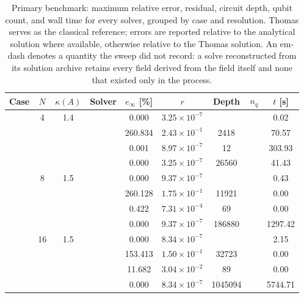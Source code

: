 \begin{table}[htbp]
  \centering
  \caption{Primary benchmark: maximum relative error, residual, circuit depth, qubit count, and wall time for every solver, grouped by case and resolution. Thomas serves as the classical reference; errors are reported relative to the analytical solution where available, otherwise relative to the Thomas solution. An em-dash denotes a quantity the sweep did not record: a solve reconstructed from its solution archive retains every field derived from the field itself and none that existed only in the process.}
  \label{tab:primary_comparison}
  \begin{tabular}{l S[table-format=3.0] S[table-format=4.1] l S[table-format=3.3] S[table-format=1.2e2] S[table-format=6.0] S[table-format=2.0] S[table-format=4.2]}
    \toprule
    {Case} & {$N$} & {$\kappa(A)$} & {Solver} & {$e_\infty$ [\%]} & {$r$} & {Depth} & {$n_q$} & {$t$ [s]} \\
    \midrule
     & 4 & 1.4 &  & 0.000 & $3.25 \times 10^{-7}$ & {\text{---}} & {\text{---}} & 0.02 \\
     &  &  &  & 260.834 & $2.43 \times 10^{-1}$ & 2418 & {\text{---}} & 70.57 \\
     &  &  &  & 0.001 & $8.97 \times 10^{-7}$ & 12 & {\text{---}} & 303.93 \\
     &  &  &  & 0.000 & $3.25 \times 10^{-7}$ & 26560 & {\text{---}} & 41.43 \\
     & 8 & 1.5 &  & 0.000 & $9.37 \times 10^{-7}$ & {\text{---}} & {\text{---}} & 0.43 \\
     &  &  &  & 260.128 & $1.75 \times 10^{-1}$ & 11921 & {\text{---}} & 0.00 \\
     &  &  &  & 0.422 & $7.31 \times 10^{-4}$ & 69 & {\text{---}} & 0.00 \\
     &  &  &  & 0.000 & $9.37 \times 10^{-7}$ & 186880 & {\text{---}} & 1297.42 \\
     & 16 & 1.5 &  & 0.000 & $8.34 \times 10^{-7}$ & {\text{---}} & {\text{---}} & 2.15 \\
     &  &  &  & 153.413 & $1.50 \times 10^{-1}$ & 32723 & {\text{---}} & 0.00 \\
     &  &  &  & 11.682 & $3.04 \times 10^{-2}$ & 89 & {\text{---}} & 0.00 \\
     &  &  &  & 0.000 & $8.34 \times 10^{-7}$ & 1045094 & {\text{---}} & 5744.71 \\

\end{tabular}
\end{table}
